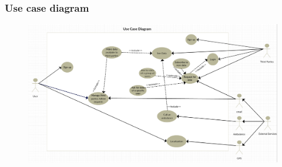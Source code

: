 \documentclass{article}
\begin{document}
\subsubsection{Use case diagram}

\begin{figure}[h!]
\centering
    \textbf{}\par\medskip
	\includegraphics[width= \linewidth]{usecase.png}
\end{figure}
\end{document}
